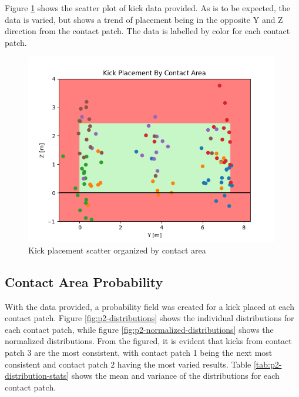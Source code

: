 \documentclass[12pt]{article}
\begin{document}
Figure \ref{fig:p2-kicks-by-contact-area} shows the scatter plot of kick data provided. As is to be expected, the data is varied, but shows a trend of placement being in the opposite Y and Z direction from the contact patch. The data is labelled by color for each contact patch.

\begin{figure}[H]
    \centering
    \includegraphics[width=0.99\textwidth]{Problem 2/out/kick_plot_by_contact_area.png}
    \caption{Kick placement scatter organized by contact area}
    \label{fig:p2-kicks-by-contact-area}
\end{figure}

\subsection{Contact Area Probability}
With the data provided, a probability field was created for a kick placed at each contact patch. Figure \ref{fig:p2-distributions} shows the individual distributions for each contact patch, while figure \ref{fig:p2-normalized-distributions} shows the normalized distributions. From the figured, it is evident that kicks from contact patch 3 are the most consistent, with contact patch 1 being the next most consistent and contact patch 2 having the most varied results. Table \ref{tab:p2-distribution-stats} shows the mean and variance of the distributions for each contact patch.
\end{document}
